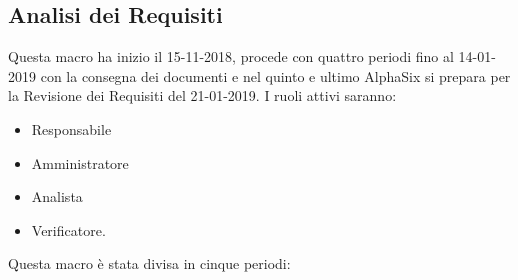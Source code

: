     \subsection{Analisi dei Requisiti}
        Questa macro ha inizio il 15-11-2018, procede con quattro periodi fino al 14-01-2019 con la consegna dei documenti e nel
        quinto e ultimo AlphaSix si prepara per la Revisione dei Requisiti del 21-01-2019. I ruoli attivi saranno: 
        \begin{itemize}
            \item Responsabile
            \item Amministratore
            \item Analista
            \item Verificatore.
        \end{itemize}
        Questa macro è stata divisa in cinque periodi:
